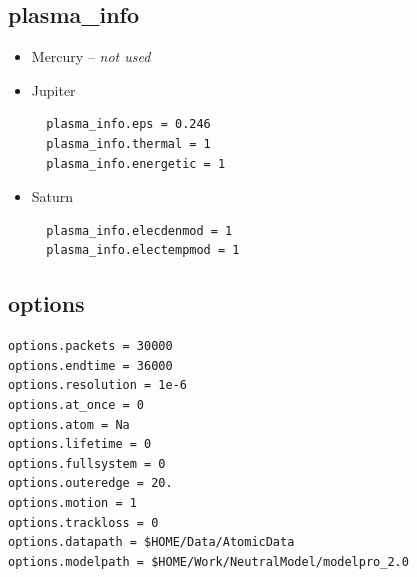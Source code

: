\documentclass[11pt]{article}
\begin{document}
\subsection{plasma\_info}

\begin{itemize}
\item Mercury -- \textit{not used}
\item Jupiter
  \begin{verbatim}
  plasma_info.eps = 0.246
  plasma_info.thermal = 1
  plasma_info.energetic = 1
  \end{verbatim}
\item Saturn 
  \begin{verbatim}
  plasma_info.elecdenmod = 1
  plasma_info.electempmod = 1
  \end{verbatim}
\end{itemize}

\subsection{options}

\begin{verbatim}
options.packets = 30000
options.endtime = 36000
options.resolution = 1e-6
options.at_once = 0
options.atom = Na
options.lifetime = 0
options.fullsystem = 0
options.outeredge = 20.
options.motion = 1
options.trackloss = 0
options.datapath = $HOME/Data/AtomicData
options.modelpath = $HOME/Work/NeutralModel/modelpro_2.0
\end{verbatim}
\end{document}
